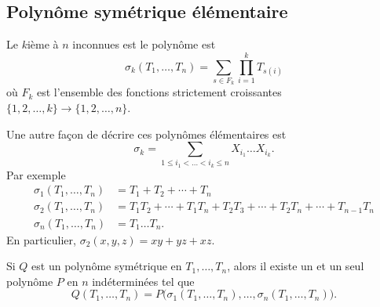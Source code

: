 \subsection{Polynôme symétrique élémentaire}

\begin{definition}  \label{DEFooTREUooZKoXeg}
    Le \( k\)ième  à \( n\) inconnues est le polynôme est
    \begin{equation}
        \sigma_k(T_1,\ldots, T_n)=\sum_{s\in F_k}\prod_{i=1}^kT_{s(i)}
    \end{equation}
    où \( F_k\) est l'ensemble des fonctions strictement croissantes \( \{ 1,2,\ldots, k \}\to\{ 1,2,\ldots, n \}\).
\end{definition}

Une autre façon de décrire ces polynômes élémentaires est
\begin{equation}
    \sigma_k=\sum_{1\leq i_1<\ldots<i_k\leq n}X_{i_1}\ldots X_{i_k}.
\end{equation}
Par exemple
\begin{subequations}
    \begin{align}
        \sigma_1(T_1,\ldots, T_n)&=T_1+T_2+\cdots +T_n\\
        \sigma_2(T_1,\ldots, T_n)&=T_1T_2+\cdots +T_1T_n+T_2T_3+\cdots +T_2T_n+\cdots +T_{n-1}T_n\\
        \sigma_n(T_1,\ldots, T_n)&=T_1\ldots T_n.
    \end{align}
\end{subequations}
En particulier, \( \sigma_2(x,y,z)=xy+yz+xz\).

\begin{theorem}  \label{TholReBiw}
    Si \( Q\) est un polynôme symétrique en \( T_1,\ldots, T_n\), alors il existe un et un seul polynôme \( P\) en \( n\) indéterminées tel que
    \begin{equation}
        Q(T_1,\ldots, T_n)=P\big( \sigma_1(T_1,\ldots, T_n),\ldots, \sigma_n(T_1,\ldots, T_n) \big).
    \end{equation}
\end{theorem}

